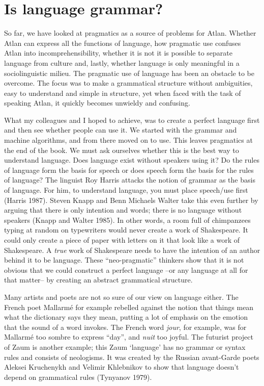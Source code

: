 \section{Is language grammar?}

So far, we have looked at pragmatics as a source of problems for Atlan. Whether Atlan can express all the functions of language, how pragmatic use confuses Atlan into incomprehensibility, whether it is not it is possible to separate language from culture and, lastly, whether language is only meaningful in a sociolinguistic milieu. The pragmatic use of language has been an obstacle to be overcome. The focus was to make a grammatical structure without ambiguities, easy to understand and simple in structure, yet when faced with the task of speaking Atlan, it quickly becomes unwieldy and confusing.			 

What my colleagues and I hoped to achieve, was to create a perfect language first and then see whether people can use it.  We started with the grammar and machine algorithms, and from there moved on to use. This leaves pragmatics at the end of the book. We must ask ourselves whether this is the best way to understand language. Does language exist without speakers using it? Do the rules of language form the basis for speech or does speech form the basis for the rules of language? The linguist Roy Harris attacks the notion of grammar as the basis of language. For him, to understand language, you must place speech/use first (Harris 1987). Steven Knapp and Benn Michaels Walter take this even further by arguing that there is only intention and words; there is no language without speakers (Knapp and Walter 1985). In other words, a room full of chimpanzees typing at random on typewriters would never create a work of Shakespeare. It could only create a piece of paper with letters on it that look like a work of Shakespeare. A {\it true} work of Shakespeare needs to have the intention of an author behind it to be language. These “neo-pragmatic” thinkers show that it is not obvious that we could construct a perfect language --or any language at all for that matter-- by creating an abstract grammatical structure. 

Many artists and poets are not so sure of our view on language either. The French poet Mallarmé for example rebelled against the notion that things mean what the dictionary says they mean, putting a lot of emphasis on the emotion that the sound of a word invokes. The French word {\it jour}, for example, was for Mallarmé too sombre to express “day”, and {\it nuit} too joyful. The futurist project of Zaum is another example; this Zaum ‘language’ has no grammar or syntax rules and consists of neologisms. It was created by the Russian avant-Garde poets Aleksei Kruchenykh and Velimir Khlebnikov to show that language doesn't depend on grammatical rules (Tynyanov 1979).						 

